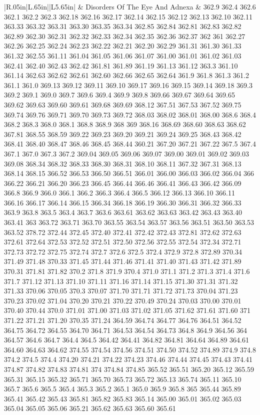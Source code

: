 \begin{longtable}{|R{.05in}|L{.65in}||L{5.65in}|}
    & Disorders Of The Eye And Adnexa &   362.9 362.4 362.6 362.1 362.2 362.3 362.18 362.16 362.17 362.14 362.15 362.12 362.13 362.10 362.11 363.33 363.32 363.31 363.30 363.35 363.34 362.85 362.84 362.81 362.83 362.82 362.89 362.30 362.31 362.32 362.33 362.34 362.35 362.36 362.37 362 361 362.27 362.26 362.25 362.24 362.23 362.22 362.21 362.20 362.29 361.31 361.30 361.33 361.32 362.55 361.11 361.04 361.05 361.06 361.07 361.00 361.01 361.02 361.03 362.41 362.40 362.43 362.42 361.81 361.89 361.19 361.13 361.12 363.3 361.10 361.14 362.63 362.62 362.61 362.60 362.66 362.65 362.64 361.9 361.8 361.3 361.2 361.1 361.0 369.13 369.12 369.11 369.10 369.17 369.16 369.15 369.14 369.18 369.3 369.2 369.1 369.0 369.7 369.6 369.4 369.9 369.8 369.66 369.67 369.64 369.65 369.62 369.63 369.60 369.61 369.68 369.69 368.12 367.51 367.53 367.52 369.75 369.74 369.76 369.71 369.70 369.73 369.72 368.03 368.02 368.01 368.00 368.6 368.4 368.2 368.3 368.0 368.1 368.8 368.9 368 369 368.16 368.69 368.60 368.63 368.62 367.81 368.55 368.59 369.22 369.23 369.20 369.21 369.24 369.25 368.43 368.42 368.41 368.40 368.47 368.46 368.45 368.44 360.21 367.20 367.21 367.22 367.5 367.4 367.1 367.0 367.3 367.2 369.04 369.05 369.06 369.07 369.00 369.01 369.02 369.03 369.08 368.34 368.32 368.33 368.30 368.31 368.10 368.11 367.32 367.31 368.13 368.14 368.15 366.52 366.53 366.50 366.51 366.01 366.00 366.03 366.02 366.04 366 366.22 366.21 366.20 366.23 366.45 366.44 366.46 366.41 366.43 366.42 366.09 366.8 366.9 366.0 366.1 366.2 366.3 366.4 366.5 366.12 366.13 366.10 366.11 366.16 366.17 366.14 366.15 366.34 366.18 366.19 366.30 366.31 366.32 366.33 363.9 363.8 363.5 363.4 363.7 363.6 363.61 363.62 363.63 363.42 363.43 363.40 363.41 363 363.72 363.71 363.70 363.55 363.54 363.57 363.56 363.51 363.50 363.53 363.52 378.72 372.44 372.45 372.40 372.41 372.42 372.43 372.81 372.62 372.63 372.61 372.64 372.53 372.52 372.51 372.50 372.56 372.55 372.54 372.34 372.71 372.73 372.72 372.75 372.74 372.7 372.6 372.5 372.4 372.9 372.8 372.89 370.34 371.49 371.48 370.33 371.45 371.44 371.46 371.41 371.40 371.43 371.42 371.89 370.31 371.81 371.82 370.2 371.8 371.9 370.4 371.0 371.1 371.2 371.3 371.4 371.6 371.7 371.12 371.13 371.10 371.11 371.16 371.14 371.15 371.30 371.31 371.32 371.33 370.06 370.05 370.3 370.07 371.70 371.71 371.72 371.73 370.04 371.23 370.23 370.02 371.04 370.20 370.21 370.22 370.49 370.24 370.03 370.00 370.01 370.40 370.44 370.0 371.01 371.00 371.03 371.02 371.05 371.62 371.61 371.60 371 371.22 371.21 371.20 370.35 371.24 364.59 364.74 364.77 364.76 364.51 364.52 364.75 364.72 364.55 364.70 364.71 364.53 364.54 364.73 364.8 364.9 364.56 364 364.57 364.6 364.7 364.4 364.5 364.42 364.41 364.82 364.81 364.64 364.89 364.61 364.60 364.63 364.62 374.55 374.54 374.56 374.51 374.50 374.52 374.89 374.9 374.8 374.2 374.5 374.4 374.20 374.21 374.22 374.23 374.46 374.44 374.45 374.43 374.41 374.87 374.82 374.83 374.81 374 374.84 374.85 365.52 365.51 365.20 365.12 365.59 365.31 365.15 365.32 365.71 365.70 365.73 365.72 365.13 365.74 365.11 365.10 365.7 365.6 365.5 365.4 365.3 365.2 365.1 365.0 365.9 365.8 365 365.44 365.89 365.41 365.42 365.43 365.81 365.82 365.83 365.14 365.00 365.01 365.02 365.03 365.04 365.05 365.06 365.21 365.62 365.63 365.60 365.61 
\end{longtable}
